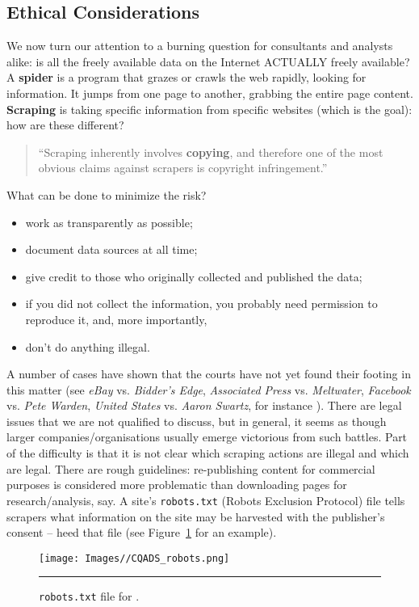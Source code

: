 \subsection{Ethical Considerations} We now turn our attention to a burning question for consultants and analysts alike: is all the freely available data on the Internet ACTUALLY freely available? 
\newl A \textbf{spider} is a program that grazes or crawls the web rapidly, looking for information. It jumps from one page to another, grabbing the entire page content. \textbf{Scraping} is taking specific information from specific websites (which is the goal): how are these different? 
\begin{quote}``Scraping inherently involves \textbf{copying}, and therefore one of the most obvious claims against scrapers is copyright infringement.'' \cite{DC_MRMN}\end{quote}
What can be done to minimize the risk? 
\begin{itemize}[noitemsep]
\item work as transparently as possible;
\item document data sources at all time;
\item give credit to those who originally collected and published the data;
\item if you did not collect the information, you probably need permission to reproduce it, and, more importantly, 
\item don't do anything illegal.
\end{itemize}
A number of  cases have shown that the courts have not yet found their footing in this matter  (see \textit{eBay} vs. \textit{Bidder's Edge}, \textit{Associated Press} vs. \textit{Meltwater}, \textit{Facebook} vs. \textit{Pete Warden}, \textit{United States} vs. \textit{Aaron Swartz}, for instance \cite{DC_M}). There are legal issues that we are not qualified to discuss, but in general, it seems as though larger companies/organisations usually emerge victorious from such battles. \newl Part of the difficulty is that it is not clear which scraping actions are illegal and which are legal. There are rough guidelines: re-publishing content for commercial purposes is considered more problematic than downloading pages for research/analysis, say. A site's  \texttt{robots.txt} (Robots Exclusion Protocol) file tells scrapers what information on the site may be harvested with the publisher's consent -- heed that file (see Figure~\ref{fig:robots} for an example).
\begin{figure}[t]
\centering
\texttt{[image: Images//CQADS\_robots.png]}
\caption[\small \texttt{robots.txt} file for a random webpage]{\small \texttt{robots.txt} file for .}\hrule\label{fig:robots}
\end{figure}
